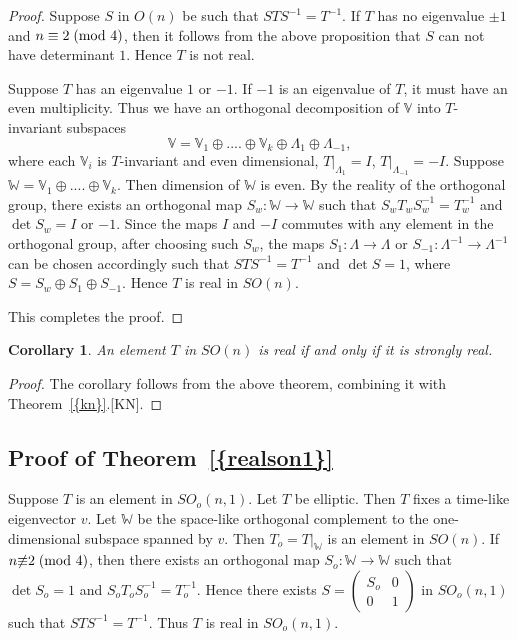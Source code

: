 \documentclass[11pt]{amsart}
\theoremstyle{definition}
\theoremstyle{remark}
\numberwithin{equation}{section}
\theoremstyle{plain}
\newtheorem{corollary}[theorem]{Corollary}
\begin{document}
\begin{proof}
Suppose $S$ in $O(n)$ be such that $STS^{-1}=T^{-1}$. If $T$ has no eigenvalue $\pm 1$ and $n \equiv 2\;(\hbox{mod }4)$, then it follows from the above proposition that $S$ can not have determinant $1$. Hence $T$ is not real. 

Suppose $T$ has an eigenvalue $1$ or $-1$.  If $-1$ is an eigenvalue of $T$,  it must have an even multiplicity.  Thus we have an orthogonal decomposition of ${\mathbb V}$ into $T$-invariant subspaces
$${\mathbb V}={\mathbb V}_1 \oplus .... \oplus {\mathbb V}_k \oplus \Lambda_1 \oplus \Lambda_{-1},$$
where each ${\mathbb V}_i$ is $T$-invariant and even dimensional, $T|_{\Lambda_1}=I$,  $T|_{\Lambda_{-1}}=-I$. Suppose ${\mathbb W}={\mathbb V}_1 \oplus .... \oplus {\mathbb V}_k$. Then dimension of ${\mathbb W}$ is even.  By the reality of the orthogonal group, there exists an orthogonal map  $S_w: {\mathbb W} \to {\mathbb W}$ such that $S_wT_wS_w^{-1}=T_w^{-1}$ and $\det S_w = I$ or $-1$. 
Since the maps $I$ and $-I$ commutes with any element in the orthogonal group, after choosing such $S_w$, the maps $S_1:{\Lambda} \to \Lambda$ or $S_{-1}:\Lambda^{-1} \to \Lambda^{-1}$ can be chosen 
accordingly such that $STS^{-1}=T^{-1}$ and $\det S=1$, where $S=S_w \oplus S_1 \oplus S_{-1}$.  Hence $T$ is real in $SO(n)$. 

This completes the proof. 
\end{proof}
\begin{corollary}
An element $T$ in $SO(n)$ is real if and only if it is strongly real. 
\end{corollary}
\begin{proof}
The corollary follows from the above theorem, combining it with {Theorem~\ref{{kn}}}.[KN]. 
\end{proof}

\subsection{Proof of {Theorem~\ref{{realson1}}}} 

Suppose $T$ is an element in $SO_o(n,1)$. Let $T$ be elliptic. Then $T$ fixes a time-like eigenvector $v$. Let ${\mathbb W}$ be the space-like orthogonal complement to the one-dimensional subspace spanned by $v$. Then $T_o=T|_{\mathbb W}$ is an element in $SO(n)$. If $n {\not \equiv} 2\;(\hbox{mod }4)$, then there exists an orthogonal map $S_o: {\mathbb W} \to {\mathbb W}$ such that $\det S_o=1$ and $S_oT_oS_o^{-1}=T_o^{-1}$. Hence there exists $S=\begin{pmatrix}S_o & 0 \\0 & 1\end{pmatrix}$ in $SO_o(n,1)$ such that $STS^{-1}=T^{-1}$. Thus $T$ is real in $SO_o(n,1)$. 
\end{document}

